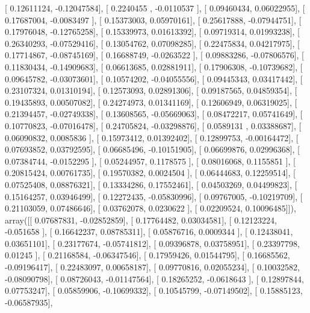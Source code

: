 \documentclass{article}
\begin{document}
       [ 0.12611124, -0.12047584],
       [ 0.2240455 , -0.0110537 ],
       [ 0.09460434,  0.06022955],
       [ 0.17687004, -0.0083497 ],
       [ 0.15373003,  0.05970161],
       [ 0.25617888, -0.07944751],
       [ 0.17976048, -0.12765258],
       [ 0.15339973,  0.01613392],
       [ 0.09719314,  0.01993238],
       [ 0.26340293, -0.07529416],
       [ 0.13054762,  0.07098285],
       [ 0.22475834,  0.04217975],
       [ 0.17714867, -0.08745169],
       [ 0.16688749, -0.0263522 ],
       [ 0.09883286, -0.07806576],
       [ 0.11830434, -0.14909683],
       [ 0.06613685,  0.02881911],
       [ 0.17906308, -0.10739682],
       [ 0.09645782, -0.03073601],
       [ 0.10574202, -0.04055556],
       [ 0.09445343,  0.03417442],
       [ 0.23107324,  0.01310194],
       [ 0.12573093,  0.02891306],
       [ 0.09187565,  0.04859354],
       [ 0.19435893,  0.00507082],
       [ 0.24274973,  0.01341169],
       [ 0.12606949,  0.06319025],
       [ 0.21394457, -0.02749338],
       [ 0.13608565, -0.05669063],
       [ 0.08472217,  0.05741649],
       [ 0.10770823, -0.07016478],
       [ 0.24705824, -0.03298876],
       [ 0.0589131 ,  0.03388687],
       [ 0.06090832,  0.0085836 ],
       [ 0.15973412,  0.01392402],
       [ 0.12899753, -0.00164472],
       [ 0.07693852,  0.03792595],
       [ 0.06685496, -0.10151905],
       [ 0.06699876,  0.02996368],
       [ 0.07384744, -0.0152295 ],
       [ 0.05244957,  0.1178575 ],
       [ 0.08016068,  0.1155851 ],
       [ 0.20815424,  0.00761735],
       [ 0.19570382,  0.0024504 ],
       [ 0.06444683,  0.12259514],
       [ 0.07525408,  0.08876321],
       [ 0.13334286,  0.17552461],
       [ 0.04503269,  0.04499823],
       [ 0.15164257,  0.03946499],
       [ 0.12272435, -0.05830996],
       [ 0.09767005, -0.10219709],
       [ 0.21103059,  0.07486646],
       [ 0.03762078,  0.0230622 ],
       [ 0.02209524,  0.10096485]]), array([[ 0.07687831, -0.02852859],
       [ 0.17764482,  0.03034581],
       [ 0.12123224, -0.051658  ],
       [ 0.16642237,  0.08785311],
       [ 0.05876716,  0.0009344 ],
       [ 0.12438041,  0.03651101],
       [ 0.23177674, -0.05741812],
       [ 0.09396878,  0.03758951],
       [ 0.23397798,  0.01245   ],
       [ 0.21168584, -0.06347546],
       [ 0.17959426,  0.01544795],
       [ 0.16685562, -0.09196417],
       [ 0.22483097,  0.00658187],
       [ 0.09770816,  0.02055234],
       [ 0.10032582, -0.08090798],
       [ 0.08726043, -0.01147564],
       [ 0.18265252, -0.0618643 ],
       [ 0.12897844,  0.07753247],
       [ 0.05859906, -0.10699332],
       [ 0.10545799, -0.07149502],
       [ 0.15885123, -0.06587935],
\end{document}
